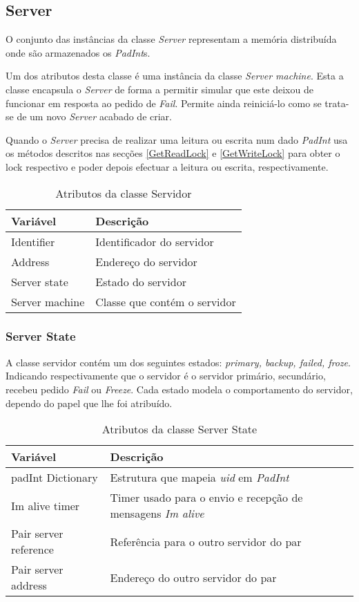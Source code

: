 \subsection{Server}
\label{Server}
O conjunto das instâncias da classe \textit{Server} representam a memória distribuída onde são armazenados os \textit{PadInt}s.

Um dos atributos desta classe é uma instância da classe \textit{Server machine}. Esta a classe encapsula o \textit{Server} de forma a permitir simular que este deixou de funcionar em resposta ao pedido de \textit{Fail}. Permite ainda reiniciá-lo como se trata-se de um novo \textit{Server} acabado de criar.

Quando o \textit{Server} precisa de realizar uma leitura ou escrita num dado \textit{PadInt} usa os métodos descritos nas secções \ref{GetReadLock} e \ref{GetWriteLock} para obter o lock respectivo e poder depois efectuar a leitura ou escrita, respectivamente.

\begin{table}[H]
\centering
\begin{tabular}{| p{2cm} | p{} |}
\hline
\textbf{Variável} & \textbf{Descrição} \\
\hline
Identifier & Identificador do servidor \\
\hline
Address & Endereço do servidor \\
\hline
Server state & Estado do servidor\\
\hline
Server machine & Classe que contém o servidor\\
\hline
\end{tabular}
\caption{Atributos da classe Servidor}
\end{table}

\subsubsection{Server State}
\label{Server State}
A classe servidor contém um dos seguintes estados: \textit{primary, backup, failed, froze}. Indicando respectivamente que o servidor é o servidor primário, secundário, recebeu pedido  \textit{Fail} ou \textit{Freeze}. Cada estado modela o comportamento do servidor, dependo do papel que lhe foi atribuído.

\begin{table}[H]
\centering
\begin{tabular}{| p{2cm} | p{} |}
\hline
\textbf{Variável} & \textbf{Descrição} \\
\hline
padInt Dictionary & Estrutura que mapeia \textit{uid} em \textit{PadInt} \\
\hline
Im alive timer & Timer usado para o envio e recepção de mensagens \textit{Im alive}\\
\hline
Pair server reference & Referência para o outro servidor do par\\
\hline
Pair server address & Endereço do outro servidor do par\\
\hline
\end{tabular}
\caption{Atributos da classe Server State}
\end{table}